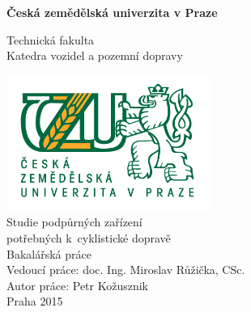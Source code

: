 \documentclass[a4paper,11pt]{article}
\begin{document}
\begin{titlepage}
    \begin{center}
        \vspace*{1cm}
        
        \textbf{Česká zemědělská univerzita v Praze}
        
        \vspace{0.5cm}
        Technická fakulta\\
        \vspace{0.5cm}
        Katedra vozidel a pozemní dopravy\\

        
        \vspace{0.8cm}
        
        \includegraphics[width=0.5\textwidth]{./logo}
        \vspace{0.8cm}\\
        Studie podpůrných zařízení\\
        potřebných k~cyklistické dopravě\\
        \vspace{0.5cm}
        Bakalářská práce\\
        
        \vfill              
	    Vedoucí práce: doc. Ing. Miroslav Růžička, CSc.\\
        \vspace{0.5cm}
        Autor práce: Petr Kožusznik\\ 
        \vspace{0.5cm}
        Praha 2015\\
        
    \end{center}
\end{titlepage}

\tableofcontents
\newpage
\end{document}
